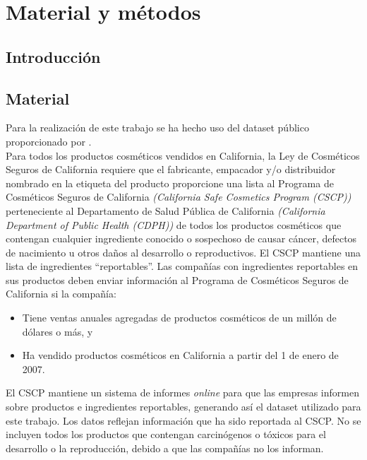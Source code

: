 
\chapter{Material y métodos} %
\label{chap:material-methods} %


\section{Introducción}




\section{Material}
Para la realización de este trabajo se ha hecho uso del dataset público  \citep{dataset} proporcionado por  \citep{healthdata}. \\

Para todos los productos cosméticos vendidos en California, la Ley de Cosméticos Seguros de California requiere que el fabricante, empacador y/o distribuidor nombrado en la etiqueta del producto proporcione una lista al Programa de Cosméticos Seguros de California \textit{(California Safe Cosmetics Program (CSCP))} perteneciente al Departamento de Salud Pública de California \textit{(California Department of Public Health (CDPH))} de todos los productos cosméticos que contengan cualquier ingrediente conocido o sospechoso de causar cáncer, defectos de nacimiento u otros daños al desarrollo o reproductivos. El CSCP mantiene una lista de ingredientes ``reportables''. Las compañías con ingredientes reportables en sus productos deben enviar información al Programa de Cosméticos Seguros de California si la compañía:

\begin{itemize}
 \item Tiene ventas anuales agregadas de productos cosméticos de un millón de dólares o más, y
 \item Ha vendido productos cosméticos en California a partir del 1 de enero de 2007.
\end{itemize}

El CSCP mantiene un sistema de informes \textit{online} para que las empresas informen sobre productos e ingredientes reportables, generando así el dataset utilizado para este trabajo. Los datos reflejan información que ha sido reportada al CSCP. No se incluyen todos los productos que contengan carcinógenos o tóxicos para el desarrollo o la reproducción, debido a que las compañías no los informan.



